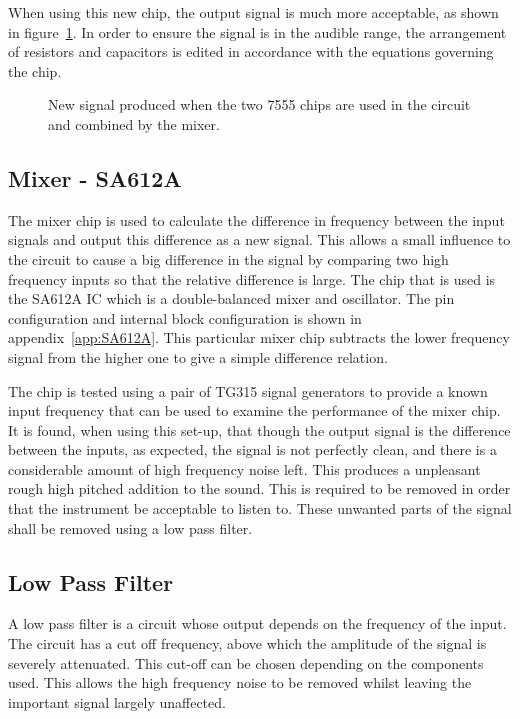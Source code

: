 When using this new chip, the output signal is much more acceptable, as shown in figure~\ref{fig:7555}. In order to ensure the signal is in the audible range, the arrangement of resistors and capacitors is edited in accordance with the equations governing the chip.

\begin{figure}[htbp]
	\centering
		
		\caption{New signal produced when the two 7555 chips are used in the circuit and combined by the mixer.}
		\label{fig:7555}
\end{figure}

\subsection{Mixer - SA612A}
\label{sec:SA612A-mixer}
The mixer chip is used to calculate the difference in frequency between the input signals and output this difference as a new signal. This allows a small influence to the circuit to cause a big difference in the signal by comparing two high frequency inputs so that the relative difference is large. The chip that is used is the SA612A IC which is a double-balanced mixer and oscillator\cite{SA612A}. The pin configuration and internal block configuration is shown in appendix~\ref{app:SA612A}. This particular mixer chip subtracts the lower frequency signal from the higher one to give a simple difference relation.

The chip is tested using a pair of TG315 signal generators to provide a known input frequency that can be used to examine the performance of the mixer chip. It is found, when using this set-up, that though the output signal is the difference between the inputs, as expected, the signal is not perfectly clean, and there is a considerable amount of high frequency noise left. This produces a unpleasant rough high pitched addition to the sound. This is required to be removed in order that the instrument be acceptable to listen to. These unwanted parts of the signal shall be removed using a low pass filter.

\subsection{Low Pass Filter}
\label{sec:lowpass}
A low pass filter is a circuit whose output depends on the frequency of the input. The circuit has a cut off frequency, above which the amplitude of the signal is severely attenuated. This cut-off can be chosen depending on the components used. This allows the high frequency noise to be removed whilst leaving the important signal largely unaffected.

